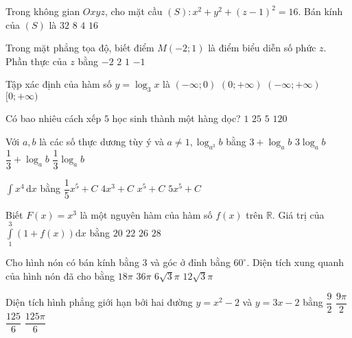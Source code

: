 \begin{ex}%
Trong không gian $O x y z$, cho mặt cầu $(S)\colon x^2+y^2+(z-1)^2=16$. Bán kính của $(S)$ là
\choice
{$32$}
{$8$}
{\True $4$}
{$16$}

\end{ex}
\begin{ex}%
Trong mặt phẳng tọa độ, biết điểm $M(-2; 1)$ là điểm biểu diễn số phức $z$. Phần thực của $z$ bằng
\choice
{\True $-2$}
{$2$}
{$1$}
{$-1$}

\end{ex}
\begin{ex}%
Tập xác định của hàm số $y=\log_3 x$ là
\choice
{$(-\infty; 0)$}
{\True $(0;+\infty)$}
{$(-\infty;+\infty)$}
{$[0;+\infty)$}

\end{ex}
\begin{ex}%
Có bao nhiêu cách xếp $5$ học sinh thành một hàng dọc?
\choice
{$1$}
{$25$}
{$5$}
{\True $120$}

\end{ex}
\begin{ex}%
Với $a, b$ là các số thực dương tùy ý và $a \neq 1, \log_{a^3} b$ bằng
\choice
{$3+\log_a b$}
{$3\log_a b$}
{$\dfrac{1}{3}+\log_a b$}
{\True $\dfrac{1}{3} \log_a b$}

\end{ex}
\begin{ex}%
$\displaystyle\int x^4 \mathrm{\,d} x$ bằng
\choice
{\True $\dfrac{1}{5} x^5+C$}
{$4 x^3+C$}
{$x^5+C$}
{$5 x^5+C$}

\end{ex}
\begin{ex}%
Biết $F(x)=x^3$ là một nguyên hàm của hàm số $f(x)$ trên $\mathbb{R}$. Giá trị của $\displaystyle\int\limits_1^3(1+f(x)) \mathrm{d} x$ bằng
\choice
{$20$}
{$22$}
{$26$}
{\True $28$}

\end{ex}
\begin{ex}%
Cho hình nón có bán kính bằng $3$ và góc ở đỉnh bằng $60^{\circ}$. Diện tích xung quanh của hình nón đã cho bằng
\choice
{\True $18\pi$}
{$36\pi$}
{$6\sqrt{3} \pi$}
{$12\sqrt{3} \pi$}

\end{ex}
\begin{ex}%
Diện tích hình phẳng giới hạn bởi hai đường $y=x^2-2$ và $ y= 3 x-2$ bằng
\choice
{\True $\dfrac{9}{2}$}
{$\dfrac{9\pi}{2}$}
{$\dfrac{125}{6}$}
{$\dfrac{125\pi}{6}$}

\end{ex}
